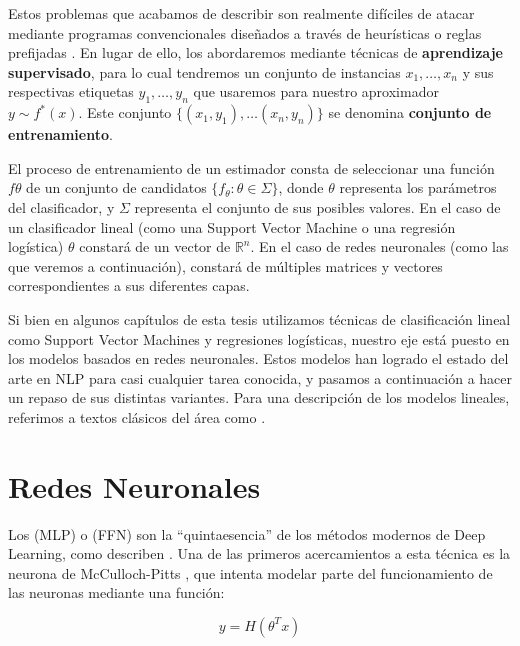 Estos problemas que acabamos de describir son realmente difíciles de atacar mediante programas convencionales diseñados a través de heurísticas o reglas prefijadas \cite{bishop2006pattern}. En lugar de ello, los abordaremos mediante técnicas de \textbf{aprendizaje supervisado}, para lo cual tendremos un conjunto de instancias $x_1, \ldots, x_n$ y sus respectivas etiquetas $y_1, \ldots , y_n$ que usaremos para  nuestro aproximador $y \sim f^*(x)$. Este conjunto $\{ (x_1, y_1), \ldots (x_n, y_n)\}$ se denomina \textbf{conjunto de entrenamiento}.

El proceso de entrenamiento de un estimador consta de seleccionar una función $f\theta$ de un conjunto de candidatos $\{f_\theta: \theta \in \Sigma\}$, donde $\theta$ representa los parámetros del clasificador, y $\Sigma$ representa el conjunto de sus posibles valores. En el caso de un clasificador lineal (como una Support Vector Machine o una regresión logística) $\theta$ constará de un vector de $\mathbb{R}^n$. En el caso de redes neuronales (como las que veremos a continuación), constará de múltiples matrices y vectores correspondientes a sus diferentes capas.


Si bien en algunos capítulos de esta tesis utilizamos técnicas de clasificación lineal como Support Vector Machines y regresiones logísticas, nuestro eje está puesto en los modelos basados en redes neuronales. Estos modelos han logrado el estado del arte en NLP para casi cualquier tarea conocida, y pasamos a continuación a hacer un repaso de sus distintas variantes. Para una descripción de los modelos lineales, referimos a textos clásicos del área como \citet{bishop2006pattern}.

\section{Redes Neuronales}


Los  (MLP) o  (FFN) son la ``quintaesencia'' de los métodos modernos de Deep Learning, como describen \citet{goodfellow2016deep}. Una de las primeros acercamientos a esta técnica es la neurona de McCulloch-Pitts \cite{mcculloch1943logical}, que intenta modelar parte del funcionamiento de las neuronas mediante una función:

\begin{equation*}
    y = H(\theta^T x)
\end{equation*}

